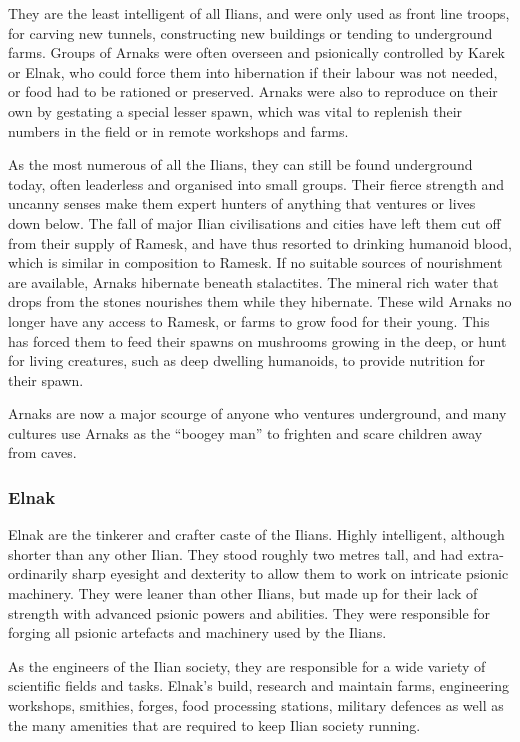They are the least intelligent of all Ilians, and were only used as front line
troops, for carving new tunnels, constructing new buildings or tending to
underground farms. Groups of Arnaks were often overseen and psionically
controlled by Karek or Elnak, who could force them into hibernation if their
labour was not needed, or food had to be rationed or preserved. Arnaks were
also to reproduce on their own by gestating a special lesser spawn, which was
vital to replenish their numbers in the field or in remote workshops and
farms.

As the most numerous of all the Ilians, they can still be found underground
today, often leaderless and organised into small groups. Their fierce strength
and uncanny senses make them expert hunters of anything that ventures or lives
down below. The fall of major Ilian civilisations and cities have left them
cut off from their supply of Ramesk, and have thus resorted to drinking
humanoid blood, which is similar in composition to Ramesk. If no suitable
sources of nourishment are available, Arnaks hibernate beneath
stalactites. The mineral rich water that drops from the stones nourishes them
while they hibernate. These wild Arnaks no longer have any access to Ramesk,
or farms to grow food for their young. This has forced them to feed their
spawns on mushrooms growing in the deep, or hunt for living creatures, such as
deep dwelling humanoids, to provide nutrition for their spawn.

Arnaks are now a major scourge of anyone who ventures underground, and many
cultures use Arnaks as the ``boogey man'' to frighten and scare children away
from caves.

\subsubsection{Elnak}
\label{sec:Elnak}

Elnak are the tinkerer and crafter caste of the Ilians. Highly intelligent,
although shorter than any other Ilian. They stood roughly two metres tall, and
had extra-ordinarily sharp eyesight and dexterity to allow them to work on
intricate psionic machinery. They were leaner than other Ilians, but made up
for their lack of strength with advanced psionic powers and abilities. They
were responsible for forging all psionic artefacts and machinery used by the
Ilians.

As the engineers of the Ilian society, they are responsible for a wide variety
of scientific fields and tasks. Elnak's build, research and maintain farms,
engineering workshops, smithies, forges, food processing stations, military
defences as well as the many amenities that are required to keep Ilian society
running.

